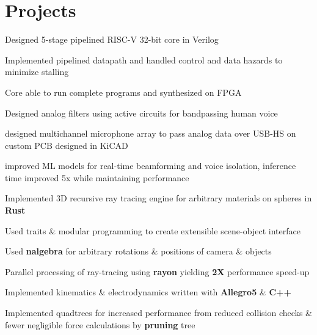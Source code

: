 \documentclass[]{chandan-cv}
\begin{document}
\begin{minipage}[t]{0.77\textwidth}

\section{Projects}

\descript{ }
\location{ }
\begin{tightemize}
	\item Designed 5-stage pipelined RISC-V 32-bit core in Verilog
	\item Implemented pipelined datapath and handled control and data hazards to minimize stalling
	\item Core able to run complete programs and synthesized on FPGA
\end{tightemize}
\sectionsep


\descript{ }
\location{ }
\begin{tightemize}
	\item Designed analog filters using active circuits for bandpassing human voice
	\item designed multichannel microphone array to pass analog data over USB-HS on custom PCB designed in KiCAD
	\item improved ML models for real-time beamforming and voice isolation, inference time improved 5x while maintaining performance
\end{tightemize}
\sectionsep


\descript{ }
\location{ }
\begin{tightemize}
	\item Implemented 3D recursive ray tracing engine for arbitrary materials on spheres in \textbf{Rust}
	\item Used traits \& modular programming to create extensible scene-object interface
	\item Used \textbf{nalgebra} for arbitrary rotations \& positions of camera \& objects 
	\item Parallel processing of ray-tracing using \textbf{rayon} yielding \textbf{2X} performance speed-up
\end{tightemize}
\sectionsep

\descript{ }
\location{ }
\begin{tightemize}
	\item Implemented kinematics \& electrodynamics written with \textbf{Allegro5} \& \textbf{C++}
	\item Implemented quadtrees for increased performance from reduced collision checks \& fewer 
	negligible force calculations by \textbf{pruning} tree
\end{tightemize}
\sectionsep


\end{minipage}
\end{document}
